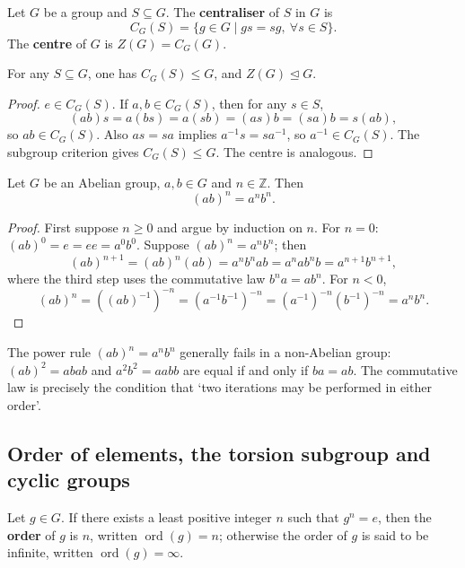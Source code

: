\begin{definition}[Centraliser]\label{def:centraliser}
Let $G$ be a group and $S\subseteq G$. The \textbf{centraliser} of $S$ in $G$ is
\[
C_G(S)=\{g\in G\mid gs=sg,\ \forall s\in S\}.
\]
The \textbf{centre} of $G$ is $Z(G)=C_G(G)$.
\end{definition}

\begin{proposition}\label{prop:centraliser_subgroup}
For any $S\subseteq G$, one has $C_G(S)\le G$, and $Z(G)\trianglelefteq G$.
\end{proposition}

\begin{proof}
$e\in C_G(S)$. If $a,b\in C_G(S)$, then for any $s\in S$,
\[
(ab)s=a(bs)=a(sb)=(as)b=(sa)b=s(ab),
\]
so $ab\in C_G(S)$. Also $as=sa$ implies $a^{-1}s=sa^{-1}$, so $a^{-1}\in C_G(S)$. The subgroup criterion gives $C_G(S)\le G$. The centre is analogous.
\end{proof}

\begin{property}\label{prop:abelian_power}
Let $G$ be an Abelian group, $a,b\in G$ and $n\in\mathbb{Z}$. Then
\[
(ab)^n=a^n b^n.
\]
\end{property}

\begin{proof}
First suppose $n\ge 0$ and argue by induction on $n$. For $n=0$: $(ab)^0=e=ee=a^0b^0$. Suppose $(ab)^n=a^n b^n$; then
\[
(ab)^{n+1}=(ab)^n(ab)=a^n b^n a b=a^n a b^n b=a^{n+1}b^{n+1},
\]
where the third step uses the commutative law $b^n a=a b^n$. For $n<0$,
\[
(ab)^n=((ab)^{-1})^{-n}=(a^{-1}b^{-1})^{-n}=(a^{-1})^{-n}(b^{-1})^{-n}=a^n b^n.
\]
\end{proof}

\begin{remark}\label{rem:abelian_power_necessary}
The power rule $(ab)^n=a^n b^n$ generally fails in a non-Abelian group: $(ab)^2=abab$ and $a^2b^2=aabb$ are equal if and only if $ba=ab$. The commutative law is precisely the condition that `two iterations may be performed in either order'.
\end{remark}

\subsection{Order of elements, the torsion subgroup and cyclic groups}

\begin{definition}\label{def:element_order}
Let $g\in G$. If there exists a least positive integer $n$ such that $g^n=e$, then the \textbf{order} of $g$ is $n$, written $\operatorname{ord}(g)=n$; otherwise the order of $g$ is said to be infinite, written $\operatorname{ord}(g)=\infty$.
\end{definition}

